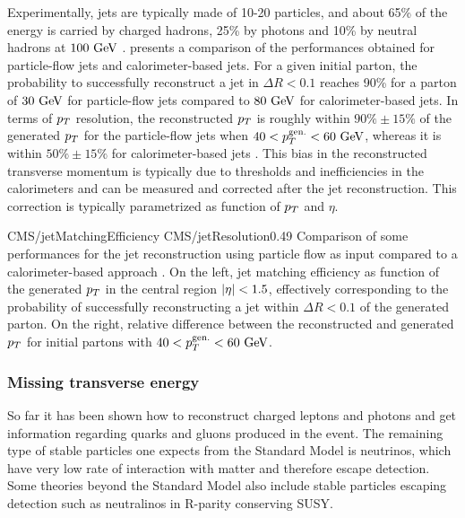     Experimentally, jets are typically made of 10-20 particles, and about 65\% of the
    energy is carried by charged hadrons, 25\% by photons and 10\% by neutral hadrons
    at $100~\text{GeV}$ \cite{JetPerf}.
     presents a comparison of the performances obtained
    for particle-flow jets and calorimeter-based jets. For a given initial parton, the
    probability to successfully reconstruct a jet in $\Delta R < 0.1$ reaches 90\% for
    a parton of $30~\text{GeV}$ for particle-flow jets compared to $80~\text{GeV}$ for
    calorimeter-based jets. In terms of $p_T$ resolution, the reconstructed $p_T$ is
    roughly within $90\% \pm 15\%$ of the generated $p_T$ for the particle-flow jets
    when $40 < p_T^\text{gen.} < 60~\text{GeV}$, whereas it is within $50\% \pm 15\%$ for
    calorimeter-based jets \cite{particleFlow}. This bias in the reconstructed transverse momentum
    is typically due to thresholds and inefficiencies in the calorimeters
    and can be measured and corrected after the jet reconstruction. This correction is
    typically parametrized as function of $p_T$ and $\eta$.

    {CMS/jetMatchingEfficiency}
    {CMS/jetResolution}{0.49}
    {Comparison of some performances for the jet reconstruction using particle flow as
    input compared to a calorimeter-based approach \cite{particleFlow}. On the left, jet matching efficiency
    as function of the generated $p_T$ in the central region $\left| \eta \right| < 1.5$, effectively
    corresponding to the probability of successfully reconstructing a jet within
    $\Delta R < 0.1$ of the generated parton. On the right, relative difference between
    the reconstructed and generated $p_T$ for initial partons with $40 < p_T^\text{gen.} < 60~\text{GeV}$.
    }

        \subsubsection{Missing transverse energy}

    So far it has been shown how to reconstruct charged leptons and photons and get
    information regarding quarks and gluons produced in the event. The remaining
    type of stable particles one expects from the Standard Model is neutrinos, which
    have very low rate of interaction with matter and therefore escape detection. Some
    theories beyond the Standard Model also include stable particles escaping detection
    such as neutralinos in R-parity conserving SUSY.

